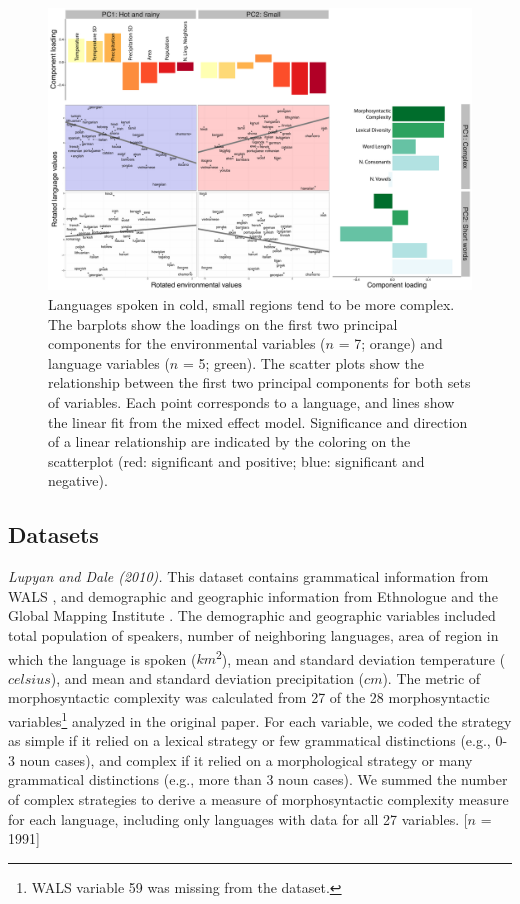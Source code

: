 \documentclass[10pt,letterpaper]{article}
\begin{document}
\begin{figure}[t]
\begin{center}
\includegraphics[scale = .35]{figs/plot2.pdf}

\end{center}
\vspace{-.5em}
\caption{Languages spoken in cold, small regions tend to be more complex. The barplots show the loadings on the first two principal components for the environmental variables ($n$ = 7; orange) and language variables ($n$ = 5; green). The scatter plots show the relationship between the first two principal components for both sets of variables. Each point corresponds to a language, and lines show the linear fit from the mixed effect model. Significance and direction of a linear relationship are indicated by the coloring on the scatterplot (red: significant  and positive; blue: significant and negative).}
\label{fig:cbias}
\vspace{-1em}
\end{figure}

\subsection{Datasets}
{\it Lupyan and Dale (2010).} This dataset contains grammatical information from WALS \cite{wals}, and demographic and geographic information from Ethnologue and the Global Mapping Institute \cite{gordon2005,gmi}. The demographic and geographic variables included total population of speakers, number of neighboring languages, area of region in which the language is spoken ($km$\textsuperscript{2}), mean and standard deviation temperature ($celsius$), and mean and standard deviation precipitation ($cm$). The metric of morphosyntactic complexity was calculated from  27 of the 28 morphosyntactic variables\footnote{WALS variable 59 was missing from the dataset.} analyzed in the original paper. For each variable, we coded the strategy as simple if it relied on a lexical strategy or few grammatical distinctions (e.g.,  0-3 noun cases), and complex if it relied on a morphological strategy or many grammatical distinctions (e.g.,  more than 3 noun cases). We summed the number of complex strategies to derive a measure of morphosyntactic complexity measure for each language, including only languages with data for all 27 variables. [$n$ = 1991] 
\end{document}
